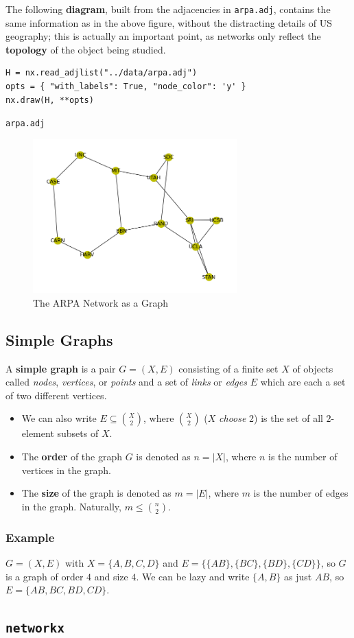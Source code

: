 \documentclass[a4paper,11pt]{article}
\newenvironment{code}{\captionsetup{type=listing}}{}
\begin{document}
The following \textbf{diagram}, built from the adjacencies in \verb|arpa.adj|, contains the same information as in the above figure, without the distracting details of US geography;
this is actually an important point, as networks only reflect the \textbf{topology} of the object being studied.

\begin{code}
\begin{verbatim}
H = nx.read_adjlist("../data/arpa.adj")
opts = { "with_labels": True, "node_color": 'y' }
nx.draw(H, **opts)
\end{verbatim}
\caption{\texttt{arpa.adj}}
\end{code}

\begin{figure}[H]
    \centering
    \includegraphics[width=0.7\textwidth]{./images/qwe_download.png}
    \caption{ The ARPA Network as a Graph }
\end{figure}

\subsection{Simple Graphs}
A \textbf{simple graph} is a pair $G = (X,E)$ consisting of a finite set $X$ of objects called \textit{nodes}, \textit{vertices}, or \textit{points} and a set of \textit{links} or \textit{edges} $E$ which are each a set of two different vertices. 
\begin{itemize}
    \item   We can also write $E \subseteq \binom{X}{2}$, where $\binom{X}{2}$ ($X$ \textit{choose} 2) is the set of all $2$-element subsets of $X$.
    \item   The \textbf{order} of the graph $G$ is denoted as $n = |X|$, where $n$ is the number of vertices in the graph.
    \item   The \textbf{size} of the graph is denoted as $m = |E|$, where $m$ is the number of edges in the graph.
            Naturally, $m \leq \binom{n}{2}$.
\end{itemize}

\subsubsection{Example}
$G=(X,E)$ with $X = \{ A, B, C, D \}$ and $E = \{ \{AB\}, \{BC\}, \{BD\}, \{CD\} \}$, so $G$ is a graph of order $4$ and size $4$.
We can be lazy and write $\{ A, B \}$ as just $AB$, so $E = \{ AB, BC, BD, CD \}$.

\subsection{\texttt{networkx}}
\end{document}
